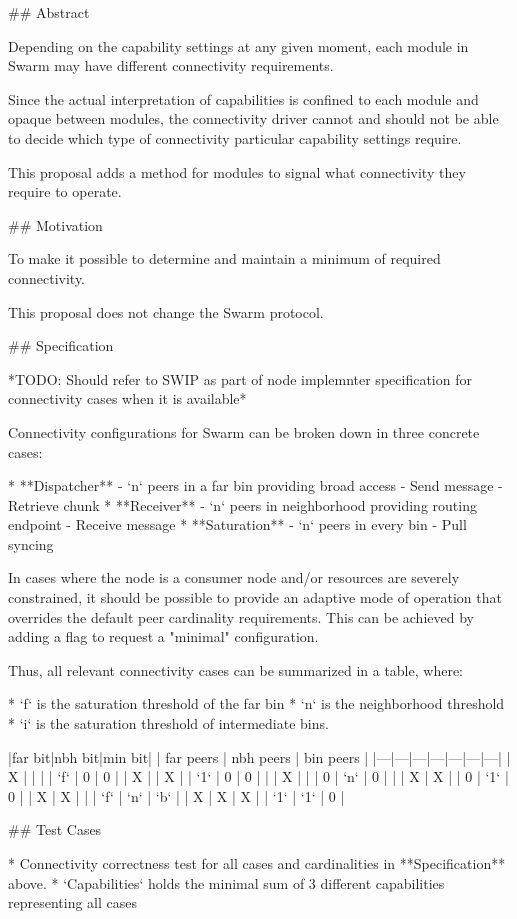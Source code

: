 
## Abstract

Depending on the capability settings at any given moment, each module in Swarm may have different connectivity requirements.

Since the actual interpretation of capabilities is confined to each module and opaque between modules, the connectivity driver cannot and should not be able to decide which type of connectivity particular capability settings require.

This proposal adds a method for modules to signal what connectivity they require to operate.


## Motivation

To make it possible to determine and maintain a minimum of required connectivity.

This proposal does not change the Swarm protocol.


## Specification

*TODO: Should refer to SWIP as part of node implemnter specification for connectivity cases when it is available*

Connectivity configurations for Swarm can be broken down in three concrete cases:

* **Dispatcher** - `n` peers in a far bin providing broad access
  - Send message
  - Retrieve chunk
* **Receiver** - `n` peers in neighborhood providing routing endpoint
  - Receive message
* **Saturation** - `n` peers in every bin
  - Pull syncing

In cases where the node is a consumer node and/or resources are severely constrained, it should be possible to provide an adaptive mode of operation that overrides the default peer cardinality requirements. This can be achieved by adding a flag to request a "minimal" configuration.

Thus, all relevant connectivity cases can be summarized in a table, where:

* `f` is the saturation threshold of the far bin
* `n` is the neighborhood threshold
* `i` is the saturation threshold of intermediate bins.

|far bit|nbh bit|min bit| | far peers | nbh peers | bin peers | 
|---|---|---|---|---|---|---|
| X |   |   | | `f` | 0 | 0 |
| X |   | X | |  `1` | 0 | 0 |
|   | X |   | |  0 | `n` | 0 | 
|   | X | X | |  0 | `1` | 0 | 
| X | X |   | |  `f` | `n` | `b` |
| X | X | X | | `1` | `1` | 0 |


## Test Cases

* Connectivity correctness test for all cases and cardinalities in **Specification** above.
* `Capabilities` holds the minimal sum of 3 different capabilities representing all cases



